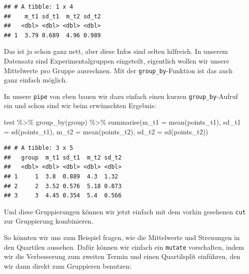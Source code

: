 \documentclass[
]{book}
\newenvironment{Shaded}{\begin{snugshade}}{\end{snugshade}}
\newcommand{\AttributeTok}[1]{\textcolor[rgb]{0.77,0.63,0.00}{#1}}
\newcommand{\FunctionTok}[1]{\textcolor[rgb]{0.00,0.00,0.00}{#1}}
\newcommand{\NormalTok}[1]{#1}
\newcommand{\SpecialCharTok}[1]{\textcolor[rgb]{0.00,0.00,0.00}{#1}}
\begin{document}
\begin{verbatim}
## # A tibble: 1 x 4
##    m_t1 sd_t1  m_t2 sd_t2
##   <dbl> <dbl> <dbl> <dbl>
## 1  3.79 0.689  4.96 0.989
\end{verbatim}

Das ist ja schon ganz nett, aber diese Infos sind selten hilfreich. In unserem Datensatz sind Experimentalgruppen eingeteilt, eigentlich wollen wir unsere Mittelwerte pro Gruppe ausrechnen. Mit der \texttt{group\_by}-Funktion ist das auch ganz einfach möglich.

In unsere \texttt{pipe} von eben bauen wir dazu einfach einen kurzen \texttt{group\_by}-Aufruf ein und schon sind wir beim erwünschten Ergebnis:

\begin{Shaded}
\begin{Highlighting}[]
\NormalTok{test }\SpecialCharTok{\%\textgreater{}\%}
  \FunctionTok{group\_by}\NormalTok{(group) }\SpecialCharTok{\%\textgreater{}\%} 
  \FunctionTok{summarise}\NormalTok{(}\AttributeTok{m\_t1 =} \FunctionTok{mean}\NormalTok{(points\_t1),}
            \AttributeTok{sd\_t1 =} \FunctionTok{sd}\NormalTok{(points\_t1),}
            \AttributeTok{m\_t2 =} \FunctionTok{mean}\NormalTok{(points\_t2),}
            \AttributeTok{sd\_t2 =} \FunctionTok{sd}\NormalTok{(points\_t2))}
\end{Highlighting}
\end{Shaded}

\begin{verbatim}
## # A tibble: 3 x 5
##   group  m_t1 sd_t1  m_t2 sd_t2
##   <dbl> <dbl> <dbl> <dbl> <dbl>
## 1     1  3.8  0.889  4.3  1.32 
## 2     2  3.52 0.576  5.18 0.873
## 3     3  4.45 0.354  5.4  0.566
\end{verbatim}

Und diese Gruppierungen können wir jetzt einfach mit dem vorhin gesehenen \texttt{cut} zur Gruppierung kombinieren.

So könnten wir uns zum Beispiel fragen, wie die Mittelwerte und Streuungen in den Quartilen aussehen. Dafür können wir einfach ein \texttt{mutate} vorschalten, indem wir die Verbesserung zum zweiten Termin und einen Quartilsplit einführen, den wir dann direkt zum Gruppieren benutzen:
\end{document}
